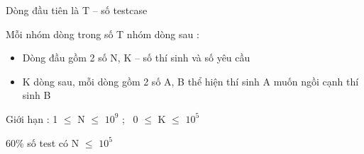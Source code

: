Dòng đầu tiên là T – số testcase


Mỗi nhóm dòng trong số T nhóm dòng sau :
\begin{itemize}
	\item Dòng đầu gồm 2 số N, K – số thí sinh và số yêu cầu
	\item K dòng sau, mỗi dòng gồm 2 số A, B thể hiện thí sinh A muốn ngồi cạnh thí sinh B
\end{itemize}

Giới hạn : 1  $\le$  N  $\le$  $10^{9}$ ;  0  $\le$  K  $\le$  $10^{5}$


60\% số test có N  $\le$  $10^{5}$
